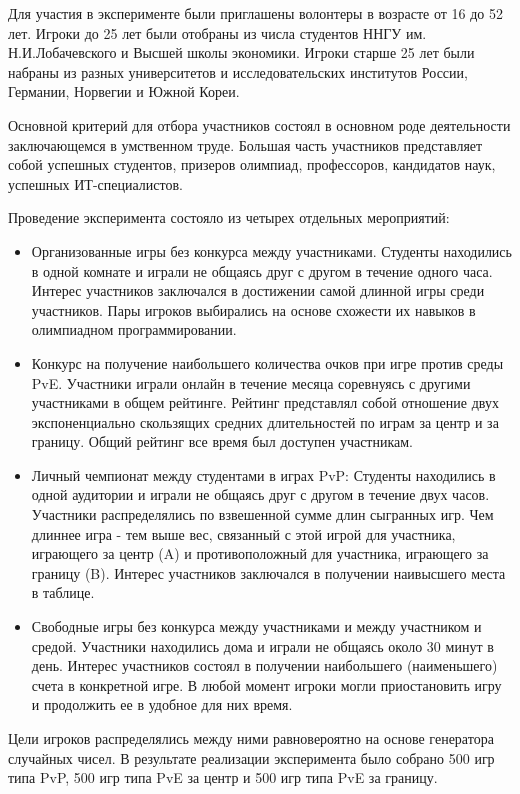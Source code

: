 Для участия в эксперименте были приглашены волонтеры в возрасте от 16 до 52 лет. 
Игроки до 25 лет были отобраны из числа студентов ННГУ им. Н.И.Лобачевского и Высшей школы экономики. 
Игроки старше 25 лет были набраны из разных университетов и исследовательских институтов России, Германии, Норвегии и Южной Кореи.

Основной критерий для отбора участников состоял в основном роде деятельности заключающемся в умственном труде.
Большая часть участников представляет собой успешных студентов, призеров олимпиад, профессоров, кандидатов наук, успешных ИТ-специалистов.

Проведение эксперимента состояло из четырех отдельных мероприятий:
\begin{itemize}
\item Организованные игры без конкурса между участниками.
    Студенты находились в одной комнате и играли не общаясь друг с другом в течение одного часа. 
    Интерес участников заключался в достижении самой длинной игры среди участников. 
    Пары игроков выбирались на основе схожести их навыков в олимпиадном программировании.
\item Конкурс на получение наибольшего количества очков при игре против среды PvE.
    Участники играли онлайн в течение месяца соревнуясь с другими участниками в общем рейтинге.
    Рейтинг представлял собой отношение двух экспоненциально скользящих средних длительностей по играм за центр и за границу.
    Общий рейтинг все время был доступен участникам.
\item Личный чемпионат между студентами в играх PvP: 
    Студенты находились в одной аудитории и играли не общаясь друг с другом в течение двух часов. 
    Участники распределялись по взвешенной сумме длин сыгранных игр. 
    Чем длиннее игра - тем выше вес, связанный с этой игрой для участника, играющего за центр (A) и противоположный для участника, играющего за границу (B).
    Интерес участников заключался в получении наивысшего места в таблице.
\item Свободные игры без конкурса между участниками и между участником и средой.
      Участники находились дома и играли не общаясь около 30 минут в день. 
      Интерес участников состоял в получении наибольшего (наименьшего) счета в конкретной игре.
      В любой момент игроки могли приостановить игру и продолжить ее в удобное для них время.
\end{itemize}
Цели игроков распределялись между ними равновероятно на основе генератора случайных чисел.
В результате реализации эксперимента было собрано 500 игр типа PvP, 500 игр типа PvE за центр и 500 игр типа PvE за границу.

